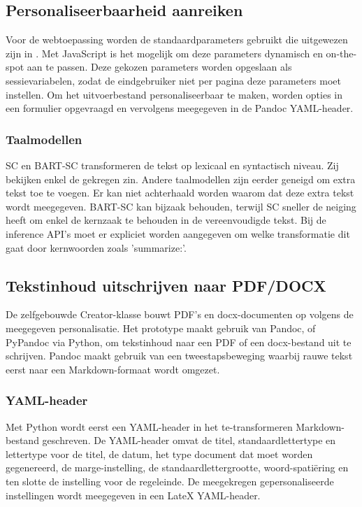 \subsection{Personaliseerbaarheid aanreiken}

Voor de webtoepassing worden de standaardparameters gebruikt die uitgewezen zijn in \textcite{Rello2013a, Rello2013b}. Met JavaScript is het mogelijk om deze parameters dynamisch en on-the-spot aan te passen. Deze gekozen parameters worden opgeslaan als sessievariabelen, zodat de eindgebruiker niet per pagina deze parameters moet instellen. Om het uitvoerbestand personaliseerbaar te maken, worden opties in een formulier opgevraagd en vervolgens meegegeven in de Pandoc YAML-header.

\subsubsection{Taalmodellen}

SC en BART-SC transformeren de tekst op lexicaal en syntactisch niveau. Zij bekijken enkel de gekregen zin. Andere taalmodellen zijn eerder geneigd om extra tekst toe te voegen. Er kan niet achterhaald worden waarom dat deze extra tekst wordt meegegeven. BART-SC kan bijzaak behouden, terwijl SC sneller de neiging heeft om enkel de kernzaak te behouden in de vereenvoudigde tekst. Bij de inference API's moet er expliciet worden aangegeven om welke transformatie dit gaat door kernwoorden zoals 'summarize:'.

\subsection{Tekstinhoud uitschrijven naar PDF/DOCX}

De zelfgebouwde Creator-klasse bouwt PDF's en docx-documenten op volgens de meegegeven personalisatie. Het prototype maakt gebruik van Pandoc, of PyPandoc via Python, om tekstinhoud naar een PDF of een docx-bestand uit te schrijven. Pandoc maakt gebruik van een tweestapsbeweging waarbij rauwe tekst eerst naar een Markdown-formaat wordt omgezet.

\subsubsection{YAML-header}

Met Python wordt eerst een YAML-header in het te-transformeren Markdown-bestand geschreven. De YAML-header omvat de titel, standaardlettertype en lettertype voor de titel, de datum, het type document dat moet worden gegenereerd, de marge-instelling, de standaardlettergrootte, woord-spatiëring en ten slotte de instelling voor de regeleinde. De meegekregen gepersonaliseerde instellingen wordt meegegeven in een LateX YAML-header. 

